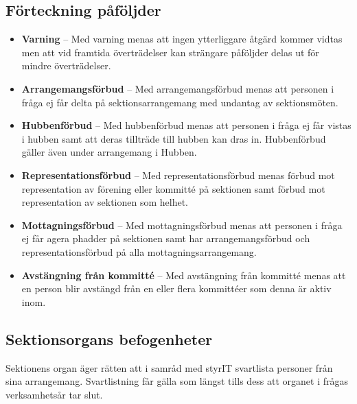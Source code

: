 \documentclass[11pt, includeaddress]{classes/cthit}
\begin{document}
\subsection{Förteckning påföljder}
\begin{itemize}
    \item \textbf{Varning} -- Med varning menas att ingen ytterliggare åtgärd kommer vidtas men att vid framtida överträdelser kan strängare påföljder delas ut för mindre överträdelser.
    
    \item \textbf{Arrangemangsförbud} -- Med arrangemangsförbud menas att personen i fråga ej får delta på sektionsarrangemang med undantag av sektionsmöten.
    
    \item \textbf{Hubbenförbud} -- Med hubbenförbud menas att personen i fråga ej får vistas i hubben samt att deras tillträde till hubben kan dras in. Hubbenförbud gäller även under arrangemang i Hubben.
    
    \item \textbf{Representationsförbud} -- Med representationsförbud menas förbud mot representation av förening eller kommitté på sektionen samt förbud mot representation av sektionen som helhet.
    
    \item \textbf{Mottagningsförbud} -- Med mottagningsförbud menas att personen i fråga ej får agera phadder på sektionen samt har arrangemangsförbud och representationsförbud på alla mottagningsarrangemang.
    
    \item \textbf{Avstängning från kommitté} -- Med avstängning från kommitté menas att en person blir avstängd från en eller flera kommittéer som denna är aktiv inom.
    
    \end{itemize}
    
\subsection{Sektionsorgans befogenheter}
Sektionens organ äger rätten att i samråd med styrIT svartlista personer från sina arrangemang. Svartlistning får gälla som längst tills dess att organet i frågas verksamhetsår tar slut.
\end{document}
